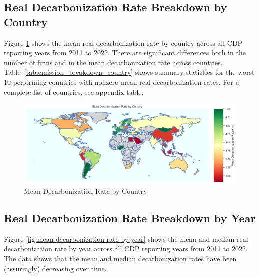  

\subsection{Real Decarbonization Rate Breakdown by Country}

Figure \ref{fig:mean-decarbonization-rate-by-country} shows the mean real decarbonization rate by country across all CDP reporting years from 2011 to 2022. There are significant differences both in the number of firms and in the mean decarbonization rate across countries. Table~\ref{tab:emission_breakdown_country} shows summary statistics for the worst $10$ performing countries with nonzero mean real decarbonization rates. For a complete list of countries, see appendix table.


\begin{figure}[htbp]
    \begin{center}
    \includegraphics[width=5in]{figures/mean_decarbonization_rate_country.png}
    \caption{Mean Decarbonization Rate by Country}
    \label{fig:mean-decarbonization-rate-by-country}
    \end{center}
\end{figure}




\subsection{Real Decarbonization Rate Breakdown by Year}

Figure \ref{fig:mean-decarbonization-rate-by-year} shows the mean and median real decarbonization rate by year across all CDP reporting years from 2011 to 2022. The data shows that the mean and median decarbonization rates have been (assuringly) decreasing over time.

